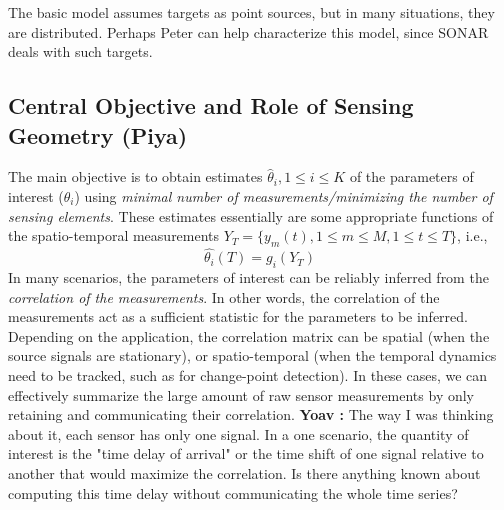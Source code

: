 \documentclass{article}
\newcommand{\comment}[3]{{\color{#1} {\bf #2 :} #3}}
\newcommand{\yoav}[1]{\comment{magenta}{Yoav}{#1}}
\begin{document}
The basic model assumes targets as point sources, but in many situations, they are distributed. {\color{red} Perhaps Peter can help characterize this model, since SONAR deals with such targets}. 

\subsection{Central Objective and Role of Sensing Geometry (Piya)}
The main objective is to obtain estimates $\hat\theta_i, 1\leq i\leq K$ of the parameters of interest ($\theta_i$) using {\em minimal number of measurements/minimizing the number of sensing elements}. These estimates essentially are some appropriate functions of the spatio-temporal measurements $Y_T = \{y_m(t),  1\leq m\leq M, 1\leq t\leq T \}$, i.e., \begin{equation}
\hat{\theta_i}(T) = g_i (Y_T) 
\end{equation} 
In many scenarios, the parameters of interest can be reliably inferred from the {\em correlation of the measurements}. In other words, the correlation of the measurements act as a sufficient statistic for the parameters to be inferred. Depending on the application, the correlation matrix can be spatial (when the source signals are stationary), or spatio-temporal (when the temporal dynamics need to be tracked, such as for change-point detection). In these cases, we can effectively summarize the large amount of raw sensor measurements by only retaining and communicating their correlation. 
\yoav{The way I was thinking about it, each sensor has only one signal. In a one scenario, the quantity of interest is the "time delay of arrival" or the time shift of one signal relative to another that would maximize the correlation. Is there anything known about computing this time delay without communicating the whole time series?}
\end{document}
